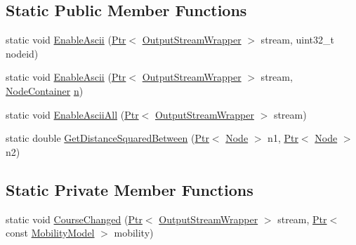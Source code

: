 \subsection*{Static Public Member Functions}
\begin{DoxyCompactItemize}
\item 
static void \hyperlink{classns3_1_1MobilityHelper_af5b410b07e9d77b782714c39e3506a9e}{Enable\+Ascii} (\hyperlink{classns3_1_1Ptr}{Ptr}$<$ \hyperlink{classns3_1_1OutputStreamWrapper}{Output\+Stream\+Wrapper} $>$ stream, uint32\+\_\+t nodeid)
\item 
static void \hyperlink{classns3_1_1MobilityHelper_a2ff8bdad85411a26b6cb66eeb8398f12}{Enable\+Ascii} (\hyperlink{classns3_1_1Ptr}{Ptr}$<$ \hyperlink{classns3_1_1OutputStreamWrapper}{Output\+Stream\+Wrapper} $>$ stream, \hyperlink{classns3_1_1NodeContainer}{Node\+Container} \hyperlink{lte__link__budget__x2__handover__measures_8m_abdb05bc5a064cf642a06c83b3392f148}{n})
\item 
static void \hyperlink{classns3_1_1MobilityHelper_a42ea087c23c41ea9c16526caa7812b40}{Enable\+Ascii\+All} (\hyperlink{classns3_1_1Ptr}{Ptr}$<$ \hyperlink{classns3_1_1OutputStreamWrapper}{Output\+Stream\+Wrapper} $>$ stream)
\item 
static double \hyperlink{classns3_1_1MobilityHelper_a4471ab3605ba031e02ee90fc43bf8c5d}{Get\+Distance\+Squared\+Between} (\hyperlink{classns3_1_1Ptr}{Ptr}$<$ \hyperlink{classns3_1_1Node}{Node} $>$ n1, \hyperlink{classns3_1_1Ptr}{Ptr}$<$ \hyperlink{classns3_1_1Node}{Node} $>$ n2)
\end{DoxyCompactItemize}
\subsection*{Static Private Member Functions}
\begin{DoxyCompactItemize}
\item 
static void \hyperlink{classns3_1_1MobilityHelper_a542a56e32f638a75ef152a3f56ce553b}{Course\+Changed} (\hyperlink{classns3_1_1Ptr}{Ptr}$<$ \hyperlink{classns3_1_1OutputStreamWrapper}{Output\+Stream\+Wrapper} $>$ stream, \hyperlink{classns3_1_1Ptr}{Ptr}$<$ const \hyperlink{classns3_1_1MobilityModel}{Mobility\+Model} $>$ mobility)
\end{DoxyCompactItemize}
